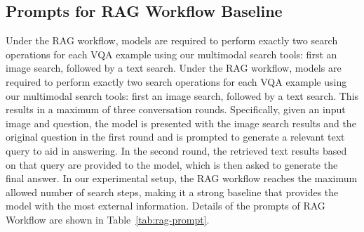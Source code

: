 \documentclass{article}
\begin{document}
\subsection{Prompts for RAG Workflow Baseline}
\label{appendix:rag-prompts}
Under the RAG workflow, models are required to perform exactly two search operations for each VQA example using our multimodal search tools: first an image search, followed by a text search. Under the RAG workflow, models are required to perform exactly two search operations for each VQA example using our multimodal search tools: first an image search, followed by a text search. This results in a maximum of three conversation rounds. Specifically, given an input image and question, the model is presented with the image search results and the original question in the first round and is prompted to generate a relevant text query to aid in answering. In the second round, the retrieved text results based on that query are provided to the model, which is then asked to generate the final answer. In our experimental setup, the RAG workflow reaches the maximum allowed number of search steps, making it a strong baseline that provides the model with the most external information. Details of the prompts of RAG Workflow are shown in Table~\ref{tab:rag-prompt}.
\end{document}
